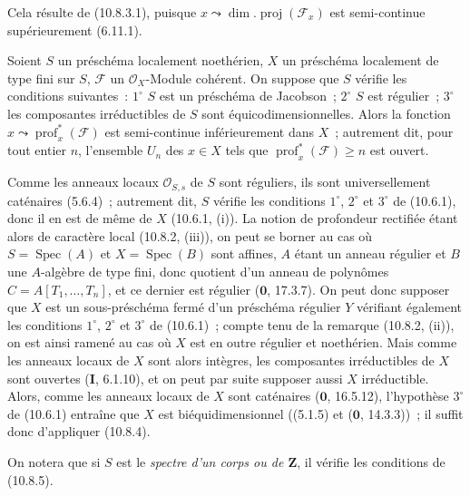 Cela résulte de (10.8.3.1), puisque
$x\leadsto\dim.\operatorname{proj}(\mathcal F_x)$ est semi-continue supérieurement
(6.11.1).

\begin{proposition}[10.8.5]
\label{IV.10.8.5-fr}
Soient $S$ un préschéma localement noethérien, $X$ un préschéma localement de
type fini sur $S$, $\mathcal F$ un $\mathcal O_X$-Module cohérent. On suppose que $S$
vérifie les conditions suivantes~: $1^\circ$ $S$ est un préschéma de Jacobson~;
$2^\circ$ $S$ est régulier~; $3^\circ$ les composantes irréductibles de $S$ sont
équicodimensionnelles. Alors la fonction
$x\leadsto\operatorname{prof}^{*}_{x}(\mathcal F)$ est semi-continue inférieurement
dans $X$~; autrement dit, pour tout entier $n$, l'ensemble $U_n$ des $x\in X$
tels que $\operatorname{prof}^{*}_{x}(\mathcal F)\geq n$ est ouvert.
\end{proposition}

Comme les anneaux locaux $\mathcal O_{S,s}$ de $S$ sont réguliers, ils sont
universellement caténaires (5.6.4)~; autrement dit, $S$ vérifie les conditions
$1^\circ$, $2^\circ$ et $3^\circ$ de (10.6.1), donc il en est de même de $X$
(10.6.1, (i)). La notion de profondeur rectifiée étant alors de caractère local
(10.8.2, (iii)), on peut se borner au cas où $S=\operatorname{Spec}(A)$ et
$X=\operatorname{Spec}(B)$ sont affines, $A$ étant un anneau régulier et $B$ une
$A$-algèbre de type fini, donc quotient d'un anneau de polynômes
$C=A[T_1,\ldots,T_n]$, et ce dernier est régulier ($\mathbf 0$, 17.3.7). On peut
donc supposer que $X$ est un sous-préschéma fermé d'un préschéma régulier $Y$
vérifiant également les conditions $1^\circ$, $2^\circ$ et $3^\circ$ de (10.6.1)~;
compte tenu de la remarque (10.8.2, (ii)), on est ainsi ramené au cas où $X$ est
en outre régulier et noethérien. Mais comme les anneaux locaux de $X$ sont alors
intègres, les composantes irréductibles de $X$ sont
ouvertes (\textbf{I}, 6.1.10), et on peut par suite supposer aussi $X$
irréductible. Alors, comme les anneaux locaux de $X$ sont caténaires
($\mathbf 0$, 16.5.12), l'hypothèse $3^\circ$ de (10.6.1) entraîne que $X$ est
biéquidimensionnel ((5.1.5) et ($\mathbf 0$, 14.3.3))~; il suffit donc d'appliquer
(10.8.4).

On notera que si $S$ est le \emph{spectre d'un corps ou de $\mathbf Z$}, il
vérifie les conditions de (10.8.5).

